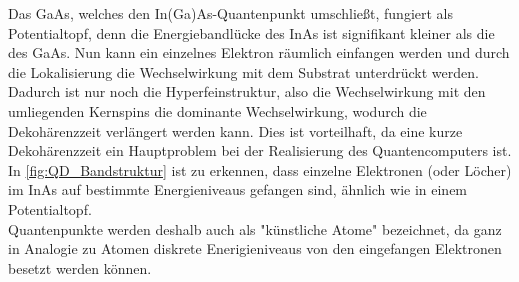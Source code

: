 \noindent Das GaAs, welches den In(Ga)As-Quantenpunkt umschließt, fungiert als Potentialtopf, denn die Energiebandlücke des InAs ist 
signifikant kleiner als die des GaAs. Nun kann ein einzelnes Elektron räumlich einfangen werden und durch die Lokalisierung 
die Wechselwirkung mit dem Substrat unterdrückt werden. Dadurch ist nur noch die Hyperfeinstruktur, also die Wechselwirkung mit den 
umliegenden Kernspins die dominante Wechselwirkung, wodurch die Dekohärenzzeit verlängert werden kann. Dies ist vorteilhaft, da 
eine kurze Dekohärenzzeit ein Hauptproblem bei der Realisierung des Quantencomputers ist.\\
In \autoref{fig:QD_Bandstruktur} ist zu erkennen, dass einzelne Elektronen (oder Löcher)
im InAs auf bestimmte Energieniveaus gefangen sind, ähnlich wie in einem Potentialtopf.\\
Quantenpunkte werden deshalb auch als "künstliche Atome" bezeichnet, da ganz in Analogie zu Atomen diskrete Enerigieniveaus 
von den eingefangen Elektronen besetzt werden können.
